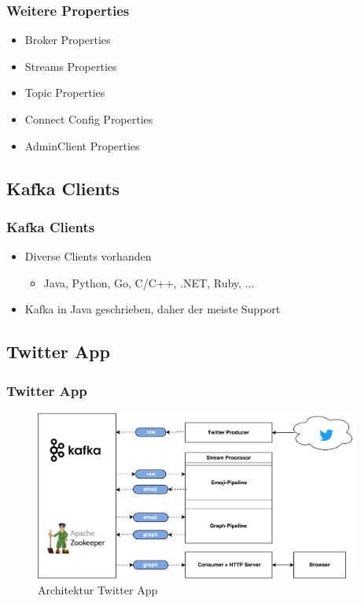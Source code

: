 \begin{frame}[fragile]
\frametitle{Weitere Properties}
\begin{itemize}
\item Broker Properties~\cite{KafkaPropBroker}
\item Streams Properties~\cite{KafkaPropStreams}
\item Topic Properties~\cite{KafkaPropTopic}
\item Connect Config Properties~\cite{KafkaPropConnectConfig}
\item AdminClient Properties~\cite{KafkaPropAdminClient}
\end{itemize}
\end{frame}

\begin{frame}[fragile]
\subsection{Kafka Clients}
\frametitle{Kafka Clients}
\begin{itemize}
\item Diverse Clients vorhanden~\cite{KafkaClients}
\begin{itemize}
\item Java, Python, Go, C/C++, .NET, Ruby, ...
\end{itemize}
\item Kafka in Java geschrieben, daher der meiste Support

\end{itemize}
\end{frame}

\begin{frame}[fragile]
\subsection{Twitter App}
\frametitle{Twitter App~\cite{GithubRepo}}
\begin{figure}
\centering
\includegraphics[width=0.95\textwidth]{figure/kafka_tut_diagram.pdf}
\caption{Architektur Twitter App}
\end{figure}
\end{frame}

